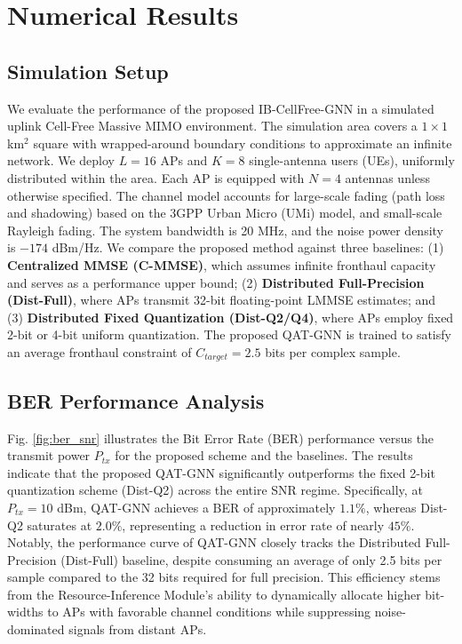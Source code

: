 \section{Numerical Results}

\subsection{Simulation Setup}
We evaluate the performance of the proposed IB-CellFree-GNN in a simulated uplink Cell-Free Massive MIMO environment. The simulation area covers a $1 \times 1$ km$^2$ square with wrapped-around boundary conditions to approximate an infinite network. We deploy $L=16$ APs and $K=8$ single-antenna users (UEs), uniformly distributed within the area. Each AP is equipped with $N=4$ antennas unless otherwise specified. The channel model accounts for large-scale fading (path loss and shadowing) based on the 3GPP Urban Micro (UMi) model, and small-scale Rayleigh fading. The system bandwidth is 20 MHz, and the noise power density is $-174$ dBm/Hz. We compare the proposed method against three baselines: (1) \textbf{Centralized MMSE (C-MMSE)}, which assumes infinite fronthaul capacity and serves as a performance upper bound; (2) \textbf{Distributed Full-Precision (Dist-Full)}, where APs transmit 32-bit floating-point LMMSE estimates; and (3) \textbf{Distributed Fixed Quantization (Dist-Q2/Q4)}, where APs employ fixed 2-bit or 4-bit uniform quantization. The proposed QAT-GNN is trained to satisfy an average fronthaul constraint of $C_{target}=2.5$ bits per complex sample.

\subsection{BER Performance Analysis}
Fig. \ref{fig:ber_snr} illustrates the Bit Error Rate (BER) performance versus the transmit power $P_{tx}$ for the proposed scheme and the baselines. The results indicate that the proposed QAT-GNN significantly outperforms the fixed 2-bit quantization scheme (Dist-Q2) across the entire SNR regime. Specifically, at $P_{tx}=10$ dBm, QAT-GNN achieves a BER of approximately $1.1\%$, whereas Dist-Q2 saturates at $2.0\%$, representing a reduction in error rate of nearly $45\%$. Notably, the performance curve of QAT-GNN closely tracks the Distributed Full-Precision (Dist-Full) baseline, despite consuming an average of only 2.5 bits per sample compared to the 32 bits required for full precision. This efficiency stems from the Resource-Inference Module's ability to dynamically allocate higher bit-widths to APs with favorable channel conditions while suppressing noise-dominated signals from distant APs.

